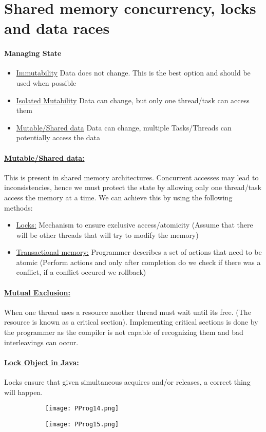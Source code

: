 \documentclass[8pt]{extreport}
\begin{document}
\section{Shared memory concurrency, locks and data races}
\paragraph{Managing State}
\begin{itemize}
\item \underline{Immutability} Data does not change. This is the best option and should be used when possible
\item \underline{Isolated Mutability} Data can change, but only one thread/task can access them
\item \underline{Mutable/Shared data} Data can change, multiple Tasks/Threads can potentially access the data
\end{itemize}
\paragraph{\underline{Mutable/Shared data:}} This is present in shared memory architectures. Concurrent accesses may lead to inconsistencies, hence we must protect the state by allowing only one thread/task access the memory at a time. We can achieve this by using the following methods:
\begin{itemize}
\item \underline{Locks:} Mechanism to ensure exclusive access/atomicity (Assume that there will be other threads that will try to modify the memory)
\item \underline{Transactional memory:} Programmer describes a set of actions that need to be atomic (Perform actions and only after completion do we check if there was a conflict, if a conflict occured we rollback)
\end{itemize}
\paragraph{\underline{Mutual Exclusion:}} When one thread uses a resource another thread must wait until its free. (The resource is known as a critical section). Implementing critical sections is done by the programmer as the compiler is not capable of recognizing them and bad interleavings can occur.
\paragraph{\underline{Lock Object in Java:}} Locks ensure that given simultaneous acquires and/or releases, a correct thing will happen.
\begin{figure}[h!]
	\centering
	\begin{subfigure}[b]{0.49\linewidth}
	\texttt{[image: PProg14.png]}
	\caption{}
	\label{PProg14}
	\end{subfigure}
	\begin{subfigure}[b]{0.49\linewidth}
	\texttt{[image: PProg15.png]}
	\caption{}
	\label{PProg15}
	\end{subfigure}
\end{figure}
\end{document}
